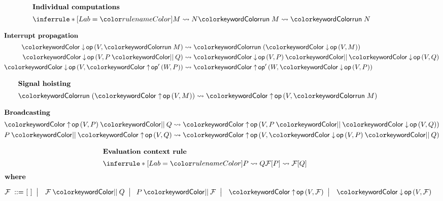 \documentclass{beamer}
\theoremstyle{definition} %
\theoremstyle{plain} %
\begin{document}
	\begin{frame}
		\begin{figure}[tp]
			\parbox{\textwidth}{
				\centering
				\tiny
				\begin{minipage}[t]{0.4\textwidth}
					\centering
					\begin{align*}
					\shortintertext{\textbf{Individual computations}}
					\coopinfer{}{
						M \reduces N
					}{
						\tmrun M \reduces \tmrun N
					}
					\end{align*}
				\end{minipage}
				\qquad
				\begin{minipage}[t]{0.4\textwidth}
					\centering
					\begin{align*}
					\shortintertext{\textbf{Interrupt propagation}}
					\tmopin{op}{V}{\tmrun M} &\reduces \tmrun {(\tmopin{op}{V}{M})}
					\\
					\tmopin{op}{V}{\tmpar P Q} &\reduces \tmpar {\tmopin{op}{V}{P}} {\tmopin{op}{V}{Q}}
					\\
					\tmopin{op}{V}{\tmopout{op'}{W}{P}} &\reduces \tmopout{op'}{W}{\tmopin{op}{V}{P}}
					\end{align*}
				\end{minipage}
			
				
				
				
				\begin{minipage}[t]{0.4\textwidth}
					\centering
					\begin{align*}
					\shortintertext{\textbf{Signal hoisting}}
					\tmrun {(\tmopout{op}{V}{M})}  &\reduces \tmopout{op}{V}{\tmrun M}
					\end{align*}
				\end{minipage}
				\qquad
				\begin{minipage}[t]{0.4\textwidth}
					\centering
					\begin{align*}
					\shortintertext{\textbf{Broadcasting}}
					\tmpar{\tmopout{op}{V}{P}}{Q} &\reduces \tmopout{op}{V}{\tmpar{P}{\tmopin{op}{V}{Q}}}
					\\
					\tmpar{P}{\tmopout{op}{V}{Q}} &\reduces \tmopout{op}{V}{\tmpar{\tmopin{op}{V}{P}}{Q}}
					\end{align*}
				\end{minipage}
				
		
				\begin{align*}
				\shortintertext{\quad\textbf{Evaluation context rule}}
				\quad
				\coopinfer{}{
					P \reduces Q
				}{
					\F[P] \reduces \F[Q]
				}
				\end{align*}
				\vspace{-8ex}
				\begin{align*}
				\shortintertext{\textbf{where}\vspace{1ex}}
				\text{$\F$}
				\bnfis& [~]
				\bnfor \tmpar \F Q \bnfor\! \tmpar P \F
				\bnfor \tmopout{op}{V}{\F}
				\bnfor \tmopin{op}{V}{\F}
				\end{align*}
			} 
		\end{figure}
	\end{frame}
\end{document}
